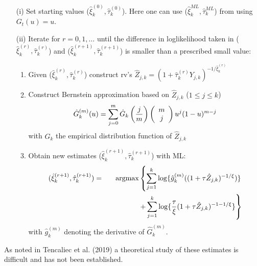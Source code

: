\documentclass[twoside,leqno,11pt]{article}
\begin{document}
\vspace{0.3cm}\noindent
{\small
\begin{enumerate}
\item[(i)] Set starting values ($\hat{\xi}_k^{(0)},\hat{\tau}_k^{(0)}$). Here one can use ($\hat{\xi}_k^{ML},\hat{\tau}_k^{ML}$) from using $G_t (u)=u$.
\item[(ii)]
Iterate for $r=0,1,\ldots$ until the difference in loglikelihood taken in ($\hat{\xi}_k^{(r)},\hat{\tau}_k^{(r)}$) and ($\hat{\xi}_k^{(r+1)},\hat{\tau}_k^{(r+1)}$) is smaller than a prescribed small value:
\begin{enumerate}
\item Given ($\hat{\xi}_k^{(r)},\hat{\tau}_k^{(r)}$)
construct rv's 
$ \hat{Z}_{j,k}= \left( 1+ \hat{\tau}_k^{(r)}Y_{j,k}\right)^{-1/\hat{\xi}_k^{(r)}} 
$
\item Construct Bernstein approximation based on $\hat{Z}_{j,k}$ ($1\leq j \leq k$)
\[
\hat{G}_k^{(m)}(u) = \sum_{j=0}^m \hat{G}_k \left( {j \over m}\right)\left( \begin{array}{c} m \\ j \end{array}\right)u^j (1-u)^{m-j}
\]
with $\hat{G}_k$ the empirical distribution function  of $\hat{Z}_{j,k}$
\item Obtain new estimates ($\hat{\xi}_k^{(r+1)},\hat{\tau}_k^{(r+1)}$) with ML:
\begin{eqnarray*}
(\hat{\xi}_k^{(r+1)},\hat{\tau}_k^{(r+1)})&=&
\mbox{argmax} \left\{
\sum_{j=1}^k \log \{ \hat{g}^{(m)}_k ((1+\tau \hat{Z}_{j,k})^{-1/\xi})\} \right.\\
&& \hspace{1.5cm} \left. + \sum_{j=1}^k
\log \{{\tau \over \xi}(1+\tau \hat{Z}_{j,k})^{-1-1/\xi} \} \right\}
\end{eqnarray*}
with $\hat{g}^{(m)}_k $ denoting the derivative of $\hat{G}_k^{(m)}$.
\end{enumerate}
\end{enumerate}
}

\vspace{0.3cm}\noindent
As noted in Tencaliec et al. (2019) a theoretical study of these estimates is difficult and has not been established. \\ 
\end{document}
